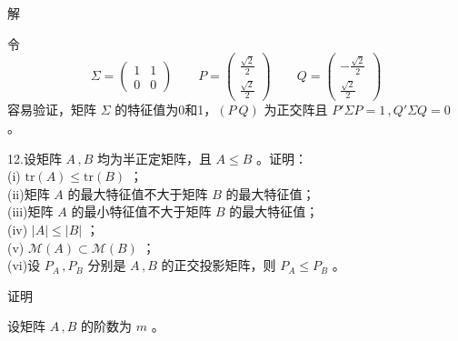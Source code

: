 \documentclass[12pt,hyperref,]{ctexart}
\begin{document}
\heiti

解

\songti

令 \begin{equation*}
\Sigma=
\begin{pmatrix}
1 & 1 \\
0 & 0
\end{pmatrix} \qquad P=
\begin{pmatrix}
\frac{\sqrt{2}}{2} \\
\frac{\sqrt{2}}{2}
\end{pmatrix} \qquad Q=
\begin{pmatrix}
-\frac{\sqrt{2}}{2} \\
\frac{\sqrt{2}}{2}
\end{pmatrix}
\end{equation*}容易验证，矩阵 \(\Sigma\) 的特征值为0和1，\((P\  Q)\)
为正交阵且 \(P'\Sigma P=1\, ,Q'\Sigma Q=0\) 。

\vspace{3em}

\kaishu

12.设矩阵 \(A\, ,B\) 均为半正定矩阵，且 \(A\le B\) 。证明：\\
(i) \(\mathrm{tr}(A) \le \mathrm{tr}(B)\) ；\\
(ii)矩阵 \(A\) 的最大特征值不大于矩阵 \(B\) 的最大特征值；\\
(iii)矩阵 \(A\) 的最小特征值不大于矩阵 \(B\) 的最大特征值；\\
(iv) \(|A|\le |B|\) ；\\
(v) \(\mathcal{M}(A)\subset \mathcal{M}(B)\) ；\\
(vi)设 \(P_A\, , P_B\) 分别是 \(A\, ,B\) 的正交投影矩阵，则
\(P_A \le P_B\) 。 \vspace{1em}

\heiti

证明

\songti

设矩阵 \(A\, , B\) 的阶数为 \(m\) 。
\end{document}
